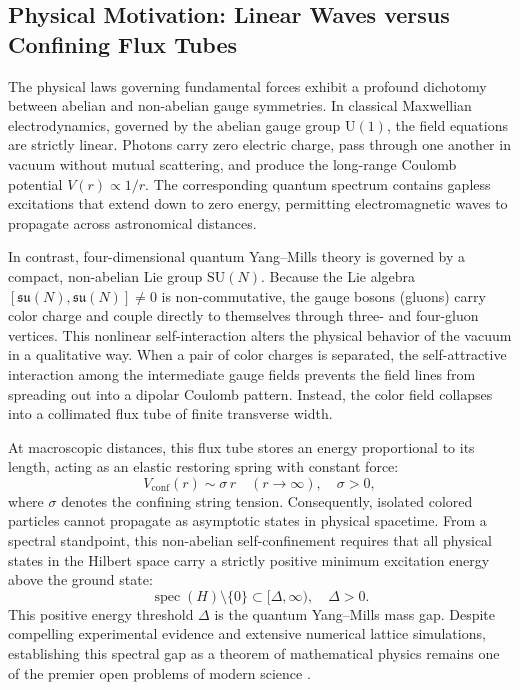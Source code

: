 \documentclass[11pt,a4paper]{article}
\theoremstyle{definition}
\theoremstyle{remark}
\newcommand{\SU}{\mathrm{SU}}
\begin{document}
\subsection{Physical Motivation: Linear Waves versus Confining Flux Tubes}
The physical laws governing fundamental forces exhibit a profound dichotomy between abelian and non-abelian gauge symmetries. In classical Maxwellian electrodynamics, governed by the abelian gauge group $\mathrm{U}(1)$, the field equations are strictly linear. Photons carry zero electric charge, pass through one another in vacuum without mutual scattering, and produce the long-range Coulomb potential $V(r) \propto 1/r$. The corresponding quantum spectrum contains gapless excitations that extend down to zero energy, permitting electromagnetic waves to propagate across astronomical distances.

In contrast, four-dimensional quantum Yang--Mills theory is governed by a compact, non-abelian Lie group $\SU(N)$. Because the Lie algebra $[\mathfrak{su}(N), \mathfrak{su}(N)] \ne 0$ is non-commutative, the gauge bosons (gluons) carry color charge and couple directly to themselves through three- and four-gluon vertices. This nonlinear self-interaction alters the physical behavior of the vacuum in a qualitative way. When a pair of color charges is separated, the self-attractive interaction among the intermediate gauge fields prevents the field lines from spreading out into a dipolar Coulomb pattern. Instead, the color field collapses into a collimated flux tube of finite transverse width.

At macroscopic distances, this flux tube stores an energy proportional to its length, acting as an elastic restoring spring with constant force:
\begin{equation}
V_{\mathrm{conf}}(r) \sim \sigma \, r \quad (r \to \infty), \quad \sigma > 0,
\end{equation}
where $\sigma$ denotes the confining string tension. Consequently, isolated colored particles cannot propagate as asymptotic states in physical spacetime. From a spectral standpoint, this non-abelian self-confinement requires that all physical states in the Hilbert space carry a strictly positive minimum excitation energy above the ground state:
\begin{equation}
\operatorname{spec}(H) \setminus \{0\} \subset [\Delta, \infty), \quad \Delta > 0.
\end{equation}
This positive energy threshold $\Delta$ is the quantum Yang--Mills mass gap. Despite compelling experimental evidence and extensive numerical lattice simulations, establishing this spectral gap as a theorem of mathematical physics remains one of the premier open problems of modern science \cite{JaffeWitten2000}.
\end{document}
